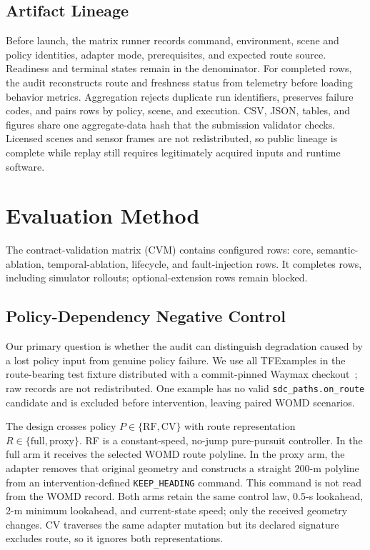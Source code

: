 \documentclass[a4paper,10pt,conference]{ieeeconf}
\begin{document}
\subsection{Artifact Lineage}

Before launch, the matrix runner records command, environment, scene and policy
identities, adapter mode, prerequisites, and expected route source. Readiness and
terminal states remain in the denominator. For completed rows, the audit reconstructs
route and freshness status from telemetry before loading behavior metrics. Aggregation
rejects duplicate run identifiers, preserves failure codes, and pairs rows by policy,
scene, and execution. CSV, JSON, tables, and figures share one aggregate-data hash that
the submission validator checks. Licensed scenes and sensor frames are not
redistributed, so public lineage is complete while replay still requires legitimately
acquired inputs and runtime software.

\section{Evaluation Method}

The contract-validation matrix (CVM) contains \CVMTotalRows{} configured rows:
\CVMCoreRows{} core, \CVMSemanticRows{} semantic-ablation, \CVMTemporalRows{}
temporal-ablation, \CVMLifecycleRows{} lifecycle, and \CVMFaultRows{}
fault-injection rows. It completes \CVMCompletedRuns{} rows, including
\CVMClosedLoopCompletedRuns{} simulator rollouts; \CVMBlockedRuns{} optional-extension
rows remain blocked.

\subsection{Policy-Dependency Negative Control}

Our primary question is whether the audit can distinguish degradation caused by a lost
policy input from genuine policy failure. We use all \CVMWaymaxScenarioCount{}
TFExamples in the route-bearing test fixture distributed with a commit-pinned Waymax
checkout~\cite{gulino2023waymax}; raw records are not redistributed. One example has no
valid \texttt{sdc\_paths.on\_route} candidate and is excluded before intervention,
leaving \CVMWaymaxEligibleScenarios{} paired WOMD scenarios.

The design crosses policy $P\in\{\mathrm{RF},\mathrm{CV}\}$ with route representation
$R\in\{\mathrm{full},\mathrm{proxy}\}$. RF is a constant-speed, no-jump pure-pursuit
controller. In the full arm it receives the selected WOMD route polyline. In the proxy
arm, the adapter removes that original geometry and constructs a straight 200-m
polyline from an intervention-defined \texttt{KEEP\_HEADING} command. This command is
not read from the WOMD record. Both arms retain the same control law, 0.5-s lookahead,
2-m minimum lookahead, and current-state speed; only the received geometry changes.
CV traverses the same adapter mutation but its declared signature excludes route, so it
ignores both representations.
\end{document}
